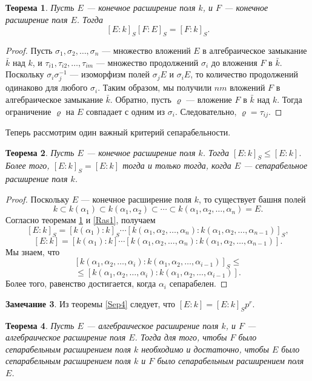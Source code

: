 \documentclass[12pt, titlepage, oneside]{amsbook}
\newtheorem{theorem}{Теорема}[chapter]
\theoremstyle{definition}
\newtheorem{remark}[theorem]{Замечание}
\theoremstyle{remark}
\begin{document}
\begin{theorem}
\label{Sep5}
Пусть $E$ --- конечное расширение поля $k$, и $F$ --- конечное расширение поля $E$. Тогда $$[E:k]_S[F:E]_S=[F:k]_S.$$
\end{theorem}

\begin{proof}
Пусть $\sigma_1,\sigma_2,\ldots,\sigma_n$ --- множество вложений $E$ в алгебраическое замыкание $\bar{k}$ над $k$, и $\tau_{i1},\tau_{i2},\ldots, \tau_{im}$ --- множество продолжений $\sigma_i$ до вложения $F$ в $\bar{k}$. Поскольку $\sigma_i\sigma^{-1}_j$ --- изоморфизм полей $\sigma_j E$ и $\sigma_i E$, то количество продолжений одинаково для любого $\sigma_i$. Таким образом, мы получили $nm$ вложений $F$ в алгебраическое замыкание $\bar{k}$. Обратно, пусть $\varrho$ --- вложение $F$ в $\bar{k}$ над $k$. Тогда ограничение $\varrho$ на $E$ совпадает с одним из $\sigma_i$. Следовательно, $\varrho=\tau_{ij}$.
\end{proof}

Теперь рассмотрим один важный критерий сепарабельности.

\begin{theorem}
\label{Sep6}
Пусть $E$ --- конечное расширение поля $k$. Тогда $[E:k]_S\leq [E:k].$ Более того, $[E:k]_S=[E:k]$ тогда и только тогда, когда $E$ --- сепарабельное расширение поля $k$.
\end{theorem}

\begin{proof}
Поскольку $E$ --- конечное расширение поля $k$, то существует башня полей $$k\subset k(\alpha_1)\subset k(\alpha_1,\alpha_2)\subset\cdots\subset k(\alpha_1,\alpha_2,\ldots,\alpha_n)=E.$$ Согласно теоремам \ref{Sep5} и \ref{Ras1}, получаем $$[E:k]_S=[k(\alpha_1):k]_S\cdots[k(\alpha_1,\alpha_2,\ldots,\alpha_n):k(\alpha_1,\alpha_2,\ldots,\alpha_{n-1})]_S,$$ $$[E:k]=[k(\alpha_1):k]\cdots[k(\alpha_1,\alpha_2,\ldots,\alpha_n):k(\alpha_1,\alpha_2,\ldots,\alpha_{n-1})].$$ Мы знаем, что $$[k(\alpha_1,\alpha_2,\ldots,\alpha_i):k(\alpha_1,\alpha_2,\ldots,\alpha_{i-1})]_S\leq$$ $$\leq[k(\alpha_1,\alpha_2,\ldots,\alpha_i):k(\alpha_1,\alpha_2,\ldots,\alpha_{i-1})].$$ Более того, равенство достигается, когда $\alpha_i$ сепарабелен.
\end{proof}

\begin{remark}
Из теоремы \ref{Sep4} следует, что $[E:k]=[E:k]_S p^r$.
\end{remark}

\begin{theorem}
\label{Sep7}
Пусть $E$ --- алгебраическое расширение поля $k$, и $F$ --- алгебраическое расширение поля $E$. Тогда для того, чтобы $F$ было сепарабельным расширением поля $k$ необходимо и достаточно, чтобы $E$ было сепарабельным расширением поля $k$ и $F$ было сепарабельным расширением поля $E$.
\end{theorem}
\end{document}
